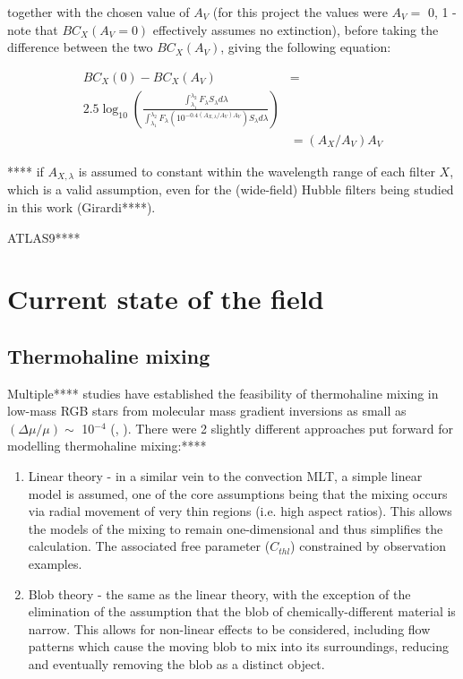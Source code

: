 \documentclass[usenatbib]{mnras}
\begin{document}
together with the chosen value of $A_{V}$ (for this project the values were $A_{V} =$ 0, 1 - note that $BC_{X}(A_{V}=0)$  effectively assumes no extinction), before taking the difference between the two $BC_{X}(A_{V})$, giving the following equation:

\begin{align}
BC_{X}(0) - BC_{X}(A_{V}) &= \\ 2.5 \log_{10} \left( \frac{\int_{\lambda_{1}}^{\lambda_{2}} F_{\lambda}  S_{\lambda} d\lambda}{\int_{\lambda_{1}}^{\lambda_{2}} F_{\lambda}\left( 10^{-0.4 \left(A_{X,\lambda}/A_{V}\right)A_{V}} \right) S_{\lambda} d\lambda} \right)
\\ &= \left(A_{X}/A_{V}\right)A_{V}
\label{BCs_diff}
\end{align}

**** if $A_{X,\lambda}$ is assumed to constant within the wavelength range of each filter $X$, which is a valid assumption, even for the (wide-field) Hubble filters being studied in this work (Girardi****).

ATLAS9****

\section{Current state of the field}
\subsection{Thermohaline mixing}
Multiple**** studies have established the feasibility of thermohaline mixing in low-mass RGB stars from molecular mass gradient inversions as small as $(\Delta\mu / \mu) \sim$ 10$^{-4}$ (\cite{2006Sci...314.1580E}, \cite{2010ApJ...723..563D}). There were 2 slightly different approaches put forward for modelling thermohaline mixing:****
\begin{enumerate}

\item Linear theory \citep{1972ApJ...172..165U} - in a similar vein to the convection MLT, a simple linear model is assumed, one of the core assumptions being that the mixing occurs via radial movement of very thin regions (i.e. high aspect ratios). This allows the models of the mixing to remain one-dimensional and thus simplifies the calculation. The associated free parameter ($C_{thl}$) constrained by observation examples.
\item Blob theory \citep{1980A&A....91..175K} - the same as the linear theory, with the exception of the elimination of the assumption that the blob of chemically-different material is narrow. This allows for non-linear effects to be considered, including flow patterns which cause the moving blob to mix into its surroundings, reducing and eventually removing the blob as a distinct object.
\end{enumerate}
\end{document}
